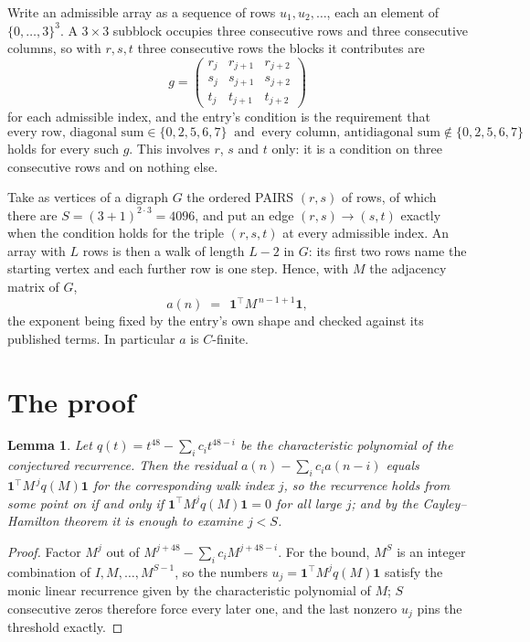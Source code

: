 \documentclass[11pt,a4paper]{article}
\theoremstyle{plain}
\newtheorem{lemma}[theorem]{Lemma}
\theoremstyle{definition}
\begin{document}
Write an admissible array as a sequence of rows $u_1,u_2,\dots$, each an element of
$\{0,\dots,3\}^{3}$. A $3\times3$ subblock occupies three consecutive rows and
three consecutive columns, so with $r,s,t$ three consecutive rows the blocks it
contributes are
\[
g=\begin{pmatrix}r_j&r_{j+1}&r_{j+2}\\ s_j&s_{j+1}&s_{j+2}\\ t_j&t_{j+1}&t_{j+2}\end{pmatrix}
\]
for each admissible index, and the entry's condition is the requirement that
\[
\text{every row, diagonal sum} \in \{0,2,5,6,7\}\ \text{ and }\ \text{every column, antidiagonal sum} \notin \{0,2,5,6,7\}
\]
holds for every such $g$. This involves $r$, $s$ and $t$ only: it is a condition on
three consecutive rows and on nothing else.

Take as vertices of a digraph $G$ the ordered PAIRS $(r,s)$ of rows, of which there are
$S=(3+1)^{2\cdot3}=4096$, and put an edge $(r,s)\to(s,t)$ exactly when the condition
holds for the triple $(r,s,t)$ at every admissible index. An array with $L$ rows is then a
walk of length $L-2$ in $G$: its first two rows name the starting vertex and each further
row is one step. Hence, with $M$ the adjacency matrix of $G$,
\[
a(n)\;=\;\,\mathbf{1}^{\!\top}M^{\,n-1+1}\mathbf{1},
\]
the exponent being fixed by the entry's own shape and checked against its published terms.
In particular $a$ is $C$-finite.

\section{The proof}

\begin{lemma}\label{lem:crit}
Let $q(t)=t^{48}-\sum_i c_it^{48-i}$ be the characteristic polynomial of the
conjectured recurrence. Then the residual $a(n)-\sum_ic_ia(n-i)$ equals
$\mathbf{1}^{\!\top}M^{\,j}q(M)\mathbf{1}$ for the corresponding walk index
$j$, so the recurrence holds from some point on if and only if
$\mathbf{1}^{\!\top}M^{j}q(M)\mathbf{1}=0$ for all large $j$; and by the
Cayley--Hamilton theorem it is enough to examine $j<S$.
\end{lemma}

\begin{proof}
Factor $M^{j}$ out of $M^{j+48}-\sum_ic_iM^{j+48-i}$. For the bound, $M^{S}$
is an integer combination of $I,M,\dots,M^{S-1}$, so the numbers
$u_j=\mathbf{1}^{\!\top}M^{j}q(M)\mathbf{1}$ satisfy the monic linear recurrence given by
the characteristic polynomial of $M$; $S$ consecutive zeros therefore force every later one,
and the last nonzero $u_j$ pins the threshold exactly.
\end{proof}
\end{document}
